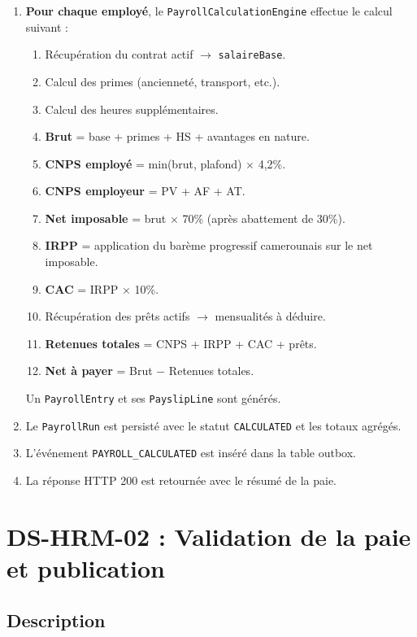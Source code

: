 \documentclass[a4paper,12pt,openany]{book}
\begin{document}
\begin{enumerate}
        \item \textbf{Pour chaque employé}, le \texttt{PayrollCalculationEngine} effectue le calcul suivant :
        \begin{enumerate}[label=\alph*.]
    \item Récupération du contrat actif $\rightarrow$ \texttt{salaireBase}.
    \item Calcul des primes (ancienneté, transport, etc.).
    \item Calcul des heures supplémentaires.
    \item \textbf{Brut} = base + primes + HS + avantages en nature.
    \item \textbf{CNPS employé} = min(brut, plafond) $\times$ 4,2\%.
    \item \textbf{CNPS employeur} = PV + AF + AT.
    \item \textbf{Net imposable} = brut $\times$ 70\% (après abattement de 30\%).
    \item \textbf{IRPP} = application du barème progressif camerounais sur le net imposable.
    \item \textbf{CAC} = IRPP $\times$ 10\%.
    \item Récupération des prêts actifs $\rightarrow$ mensualités à déduire.
    \item \textbf{Retenues totales} = CNPS + IRPP + CAC + prêts.
    \item \textbf{Net à payer} = Brut $-$ Retenues totales.
        \end{enumerate}
        Un \texttt{PayrollEntry} et ses \texttt{PayslipLine} sont générés.

        \item Le \texttt{PayrollRun} est persisté avec le statut \texttt{CALCULATED} et les totaux agrégés.

        \item L'événement \texttt{PAYROLL\_CALCULATED} est inséré dans la table outbox.

        \item La réponse HTTP 200 est retournée avec le résumé de la paie.
    \end{enumerate}


    \section{DS-HRM-02 : Validation de la paie et publication}

    \subsection{Description}
\end{document}
